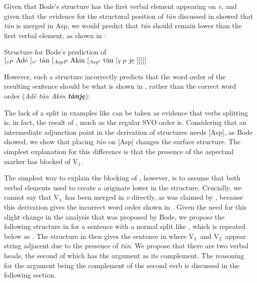 \documentclass[output=paper,newtxmath,modfonts,nonflat,draftmode]{langsci/langscibook}
\begin{document}
Given that Bode's structure has the first verbal element appearing on \textit{v}, and given that the evidence for the structural position of \textit{tún} discussed in  showed that \textit{tún} is merged in Asp, we would predict that \textit{tún} should remain lower than the first verbal element, as shown in :

\ea\label{ex:parrish:BodeTunStructure} Structure for Bode's prediction of \\ 

$[_{vP}\text{ Adé } [_{v'}\text{ tàn }[_{AspP}\text{ Akin }[_{Asp'}\text{ tún }[_{VP}\text{ j\d{e} }]]]]]$

\z

However, such a structure incorrectly predicts that the word order of the resulting sentence should be what is shown in , rather than the correct word order (\textit{Adé tún Akin \textbf{tànj\d{e}}}):

\label{ex:parrish:BodeTunSentence}
\z

The lack of a split in examples like  can be taken as evidence that verbs splitting is, in fact, the result of , much as the regular SVO order is. Considering that an intermediate adjunction point in the derivation of  structures needs [Asp], as Bode showed, we show that placing \textit{tún} on [Asp] changes the surface structure. The simplest explanation for this difference is that the presence of the aspectual marker has blocked  of V$_{1}$. 

The simplest way to explain the blocking of , however, is to assume that both verbal elements used to create a  originate lower in the structure. Crucially, we cannot say that V$_{1}$\ has been merged in \textit{v} directly, as was claimed by \citet{Bode2007}, because this derivation gives the incorrect word order shown in . Given the need for this slight change in the analysis that was proposed by Bode, we propose the following structure in  for a sentence with a normal split like , which is repeated below as . The structure in  then gives the sentence in  where V$_{1}$\ and V$_{2}$\ appear string adjacent due to the presence of \textit{tún}. We propose that there are two verbal heads, the second of which has the argument as its complement. The reasoning for the argument being the complement of the second verb is discussed in the following section.
\end{document}
